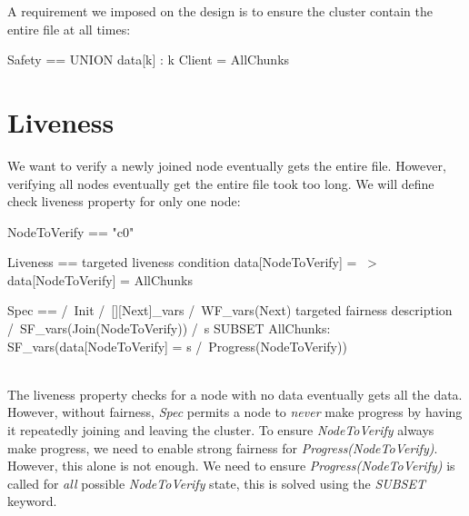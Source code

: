 A requirement we imposed on the design is to ensure the cluster contain the
entire file at all times:\\

\begin{tla}
Safety == 
    UNION {data[k] : k \in Client} = AllChunks
\end{tla}
\begin{tlatex}
%
\end{tlatex}

\section{Liveness}

We want to verify a newly joined node eventually gets the entire file. However, 
verifying all nodes eventually get the entire file took too long. We will define
check liveness property for only one node:\\

\begin{tla}
NodeToVerify == "c0"

Liveness == 
    \* targeted liveness condition
    data[NodeToVerify] = {} ~> data[NodeToVerify] = AllChunks

Spec ==
    /\ Init
    /\ [][Next]_vars
    /\ WF_vars(Next)
    \* targeted fairness description
    /\ SF_vars(Join(NodeToVerify))
    /\ \A s \in SUBSET AllChunks: 
        SF_vars(data[NodeToVerify] = s /\ Progress(NodeToVerify))
\end{tla}
\begin{tlatex}
%
\@pvspace{8.0pt}%
%
%
%
\@xx{}%
\@pvspace{8.0pt}%
%
%
%
%
%
%
\@xx{}%
%
%
\end{tlatex}
\\

The liveness property checks for a node with no data eventually gets all the
data. \\

However, without fairness, \textit{Spec} permits a node to \textit{never} make
progress by having it repeatedly joining and leaving the cluster. To ensure 
\textit{NodeToVerify} always make progress, we need to enable strong fairness 
for \textit{Progress(NodeToVerify)}. However, this alone is not enough. We need 
to ensure \textit{Progress(NodeToVerify)} is called for \textit{all} possible
\textit{NodeToVerify} state, this is solved using the \textit{SUBSET} keyword.

% 
